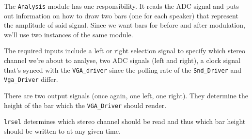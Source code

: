 The \verb=Analysis= module has one responsibility. It reads the ADC signal and puts out information on how to draw two bars (one for each speaker) that represent the amplitude of said signal. Since we want bars for before and after modulation, we'll use two instances of the same module. 

The required inputs include a left or right selection signal to specify which stereo channel we're about to analyse, two ADC signals (left and right), a clock signal that's synced with the \verb=VGA_driver= since the polling rate of the \verb=Snd_Driver= and \verb=Vga_Driver= differ.  

There are two output signals (once again, one left, one right). They determine the height of the bar which the \verb=VGA_Driver= should render. 

\verb=lrsel= determines which stereo channel should be read and thus which bar height should be written to at any given time.
